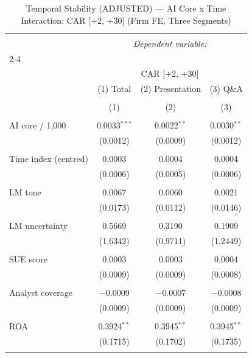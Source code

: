 
\begin{table}[!htbp] \centering 
  \caption{Temporal Stability (ADJUSTED) — AI Core x Time Interaction: CAR [+2, +30] (Firm FE, Three Segments)} 
  \label{} 
\begin{tabular}{@{\extracolsep{5pt}}lccc} 
\\[-1.8ex]\hline 
\hline \\[-1.8ex] 
 & \multicolumn{3}{c}{\textit{Dependent variable:}} \\ 
\cline{2-4} 
\\[-1.8ex] & \multicolumn{3}{c}{CAR [+2, +30]} \\ 
 & (1) Total & (2) Presentation & (3) Q\&A \\ 
\\[-1.8ex] & (1) & (2) & (3)\\ 
\hline \\[-1.8ex] 
 AI core / 1,000 & 0.0033$^{***}$ & 0.0022$^{**}$ & 0.0030$^{**}$ \\ 
  & (0.0012) & (0.0009) & (0.0012) \\ 
  & & & \\ 
 Time index (centred) & 0.0003 & 0.0004 & 0.0004 \\ 
  & (0.0006) & (0.0005) & (0.0006) \\ 
  & & & \\ 
 LM tone & 0.0067 & 0.0060 & 0.0021 \\ 
  & (0.0173) & (0.0112) & (0.0146) \\ 
  & & & \\ 
 LM uncertainty & 0.5669 & 0.3190 & 0.1909 \\ 
  & (1.6342) & (0.9711) & (1.2449) \\ 
  & & & \\ 
 SUE score & 0.0003 & 0.0003 & 0.0004 \\ 
  & (0.0009) & (0.0009) & (0.0008) \\ 
  & & & \\ 
 Analyst coverage & $-$0.0009 & $-$0.0007 & $-$0.0008 \\ 
  & (0.0009) & (0.0009) & (0.0009) \\ 
  & & & \\ 
 ROA & 0.3924$^{**}$ & 0.3945$^{**}$ & 0.3945$^{**}$ \\ 
  & (0.1715) & (0.1702) & (0.1735) \\ 
  & & & \\ 

\end{tabular}
\end{table}
